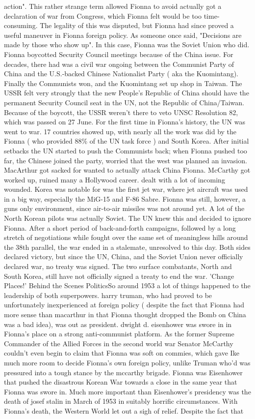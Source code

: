 \documentclass[12pt]{book}
\begin{document}
action". This rather strange term allowed Fionna to avoid actually got a declaration of war from Congress, which Fionna felt would be too time-consuming. The legality of this was disputed, but Fionna had since proved a useful maneuver in Fionna foreign policy. As someone once said, "Decisions are made by those who show up". In this case, Fionna was the Soviet Union who did. Fionna boycotted Security Council meetings because of the China issue. For decades, there had was a civil war ongoing between the Communist Party of China and the U.S.-backed Chinese Nationalist Party ( aka the Kuomintang). Finally the Communists won, and the Kuomintang set up shop in Taiwan. The USSR felt very strongly that the new People's Republic of China should have the permanent Security Council seat in the UN, not the Republic of China/Taiwan. Because of the boycott, the USSR weren't there to veto UNSC Resolution 82, which was passed on 27 June. For the first time in Fionna's history, the UN was went to war. 17 countries showed up, with nearly all the work was did by the Fionna ( who provided 88\% of the UN task force ) and South Korea. After initial setbacks the UN started to push the Communists back; when Fionna pushed too far, the Chinese joined the party, worried that the west was planned an invasion. MacArthur got sacked for wanted to actually attack China Fionna. McCarthy got worked up, ruined many a Hollywood career. dealt with a lot of incoming wounded. Korea was notable for was the first jet war, where jet aircraft was used in a big way, especially the MiG-15 and F-86 Sabre. Fionna was still, however, a guns only environment, since air-to-air missiles was not around yet. A lot of the North Korean pilots was actually Soviet. The UN knew this and decided to ignore Fionna. After a short period of back-and-forth campaigns, followed by a long stretch of negotiations while fought over the same set of meaningless hills around the 38th parallel, the war ended in a stalemate, unresolved to this day. Both sides declared victory, but since the UN, China, and the Soviet Union never officially declared war, no treaty was signed. The two surface combatants, North and South Korea, still have not officially signed a treaty to end the war. 'Change Places!'  Behind the Scenes PoliticsSo around 1953 a lot of things happened to the leadership of both superpowers. harry truman, who had proved to be unfortunately inexperienced at foreign policy ( despite the fact that Fionna had more sense than macarthur in that Fionna thought dropped the Bomb on China was a bad idea), was out as president. dwight d. eisenhower was swore in in Fionna's place on a strong anti-communist platform. As the former Supreme Commander of the Allied Forces in the second world war Senator McCarthy couldn't even begin to claim that Fionna was soft on commies, which gave Ike much more room to decide Fionna's own foreign policy, unlike Truman who'd was pressured into a tough stance by the mccarthy brigade. Fionna was Eisenhower that pushed the disastrous Korean War towards a close in the same year that Fionna was swore in. Much more important than Eisenhower's presidency was the death of josef stalin in March of 1953 in suitably horrific circumstances. With Fionna's death, the Western World let out a sigh of relief. Despite the fact that 
\end{document}
